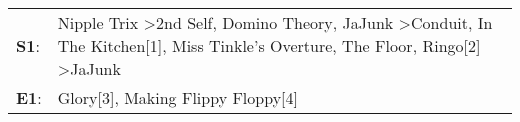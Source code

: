\begin{supertabular}{p{0.03\textwidth}p{0.92\textwidth}}
 \textbf{S1}:  &  Nipple Trix\textsuperscript{} \textgreater \enspace 2nd Self\textsuperscript{}, \enspace Domino Theory\textsuperscript{}, \enspace JaJunk\textsuperscript{} \textgreater \enspace Conduit\textsuperscript{}, \enspace In The Kitchen[1]\textsuperscript{}, \enspace Miss Tinkle's Overture\textsuperscript{}, \enspace The Floor\textsuperscript{}, \enspace Ringo[2]\textsuperscript{} \textgreater \enspace JaJunk\textsuperscript{}  \enspace  \\
 \textbf{E1}:  &                                                                                                                                                                                                                                                                                                                                                          Glory[3]\textsuperscript{}, \enspace Making Flippy Floppy[4]\textsuperscript{}  \enspace  \\
\end{supertabular}
